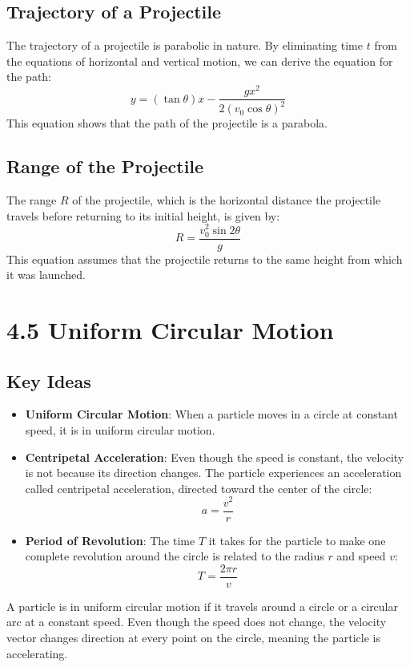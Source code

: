 \documentclass{article}
\begin{document}
\subsection*{Trajectory of a Projectile}

The trajectory of a projectile is parabolic in nature. By eliminating time $t$ from the equations of horizontal and vertical motion, we can derive the equation for the path:
\[
y = ( \tan \theta) x - \frac{g x^2}{2 (v_0 \cos \theta)^2}
\]
This equation shows that the path of the projectile is a parabola.

\subsection*{Range of the Projectile}

The range $R$ of the projectile, which is the horizontal distance the projectile travels before returning to its initial height, is given by:
\[
R = \frac{v_0^2 \sin 2\theta}{g}
\]
This equation assumes that the projectile returns to the same height from which it was launched.

\section*{4.5 Uniform Circular Motion}
\subsection*{Key Ideas}
\begin{itemize}
    \item \textbf{Uniform Circular Motion}: When a particle moves in a circle at constant speed, it is in uniform circular motion.
    \item \textbf{Centripetal Acceleration}: Even though the speed is constant, the velocity is not because its direction changes. The particle experiences an acceleration called centripetal acceleration, directed toward the center of the circle:
    \[
    a = \frac{v^2}{r}
    \]
    \item \textbf{Period of Revolution}: The time $T$ it takes for the particle to make one complete revolution around the circle is related to the radius $r$ and speed $v$:
    \[
    T = \frac{2\pi r}{v}
    \]
\end{itemize}
A particle is in uniform circular motion if it travels around a circle or a circular arc at a constant speed. Even though the speed does not change, the velocity vector changes direction at every point on the circle, meaning the particle is accelerating.
\end{document}
